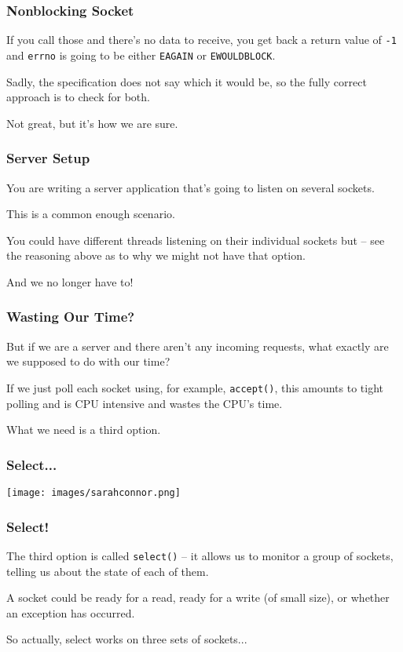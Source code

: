 \begin{frame}
	\frametitle{Nonblocking Socket}

	If you call those and there's no data to receive, you get back a return value of \texttt{-1} and \texttt{errno} is going to be either \texttt{EAGAIN} or \texttt{EWOULDBLOCK}.

	Sadly, the specification does not say which it would be, so the fully correct approach is to check for both.

	Not great, but it's how we are sure.

\end{frame}


\begin{frame}
	\frametitle{Server Setup}

	You are writing a server application that's going to listen on several sockets.

	This is a common enough scenario.

	You could have different threads listening on their individual sockets but -- see the reasoning above as to why we might not have that option.

	And we no longer have to!

\end{frame}


\begin{frame}
	\frametitle{Wasting Our Time?}

	But if we are a server and there aren't any incoming requests, what exactly are we supposed to do with our time?

	If we just poll each socket using, for example, \texttt{accept()}, this amounts to tight polling and is CPU intensive and wastes the CPU's time.

	What we need is a third option.
\end{frame}


\begin{frame}
	\frametitle{Select...}

	\begin{center}
		\texttt{[image: images/sarahconnor.png]}
	\end{center}

\end{frame}

\begin{frame}
	\frametitle{Select!}

	The third option is called \texttt{select()} -- it allows us to monitor a group of sockets, telling us about the state of each of them.

	A socket could be ready for a read, ready for a write (of small size), or whether an exception has occurred.

	So actually, select works on three sets of sockets...

\end{frame}

